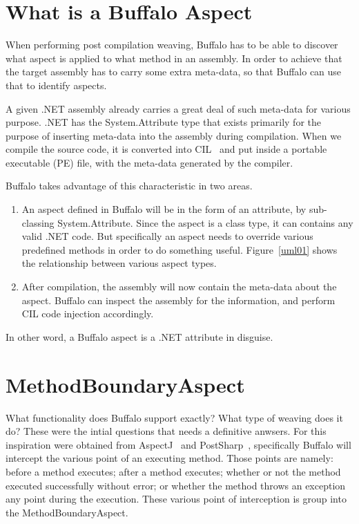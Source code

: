 \section{What is a Buffalo Aspect}

When performing post compilation weaving, Buffalo has to be able to discover what aspect is applied to what method in an assembly. In order to achieve that the target assembly has to carry some extra meta-data, so that Buffalo can use that to identify aspects.

A given .NET assembly already carries a great deal of such meta-data for various purpose. .NET has the System.Attribute type that exists primarily for the purpose of inserting meta-data into the assembly during compilation. When we compile the source code, it is converted into CIL~\cite{msil_text} and put inside a portable executable (PE) file, with the meta-data generated by the compiler. 

Buffalo takes advantage of this characteristic in two areas.
\begin{enumerate}
	\item An aspect defined in Buffalo will be in the form of an attribute, by sub-classing System.Attribute. Since the aspect is a class type, it can contains any valid .NET code. But specifically an aspect needs to override various predefined methods in order to do something useful. Figure~\ref{uml01} shows the relationship between various aspect types.
	\item After compilation, the assembly will now contain the meta-data about the aspect. Buffalo can inspect the assembly for the information, and perform CIL code injection accordingly.
\end{enumerate}

In other word, a Buffalo aspect is a .NET attribute in disguise.

\section{MethodBoundaryAspect}
What functionality does Buffalo support exactly? What type of weaving does it do? These were the intial questions that needs a definitive anwsers. For this inspiration were obtained from AspectJ~\cite{aspectj_faq} and PostSharp~\cite{postsharp}, specifically Buffalo will intercept the various point of an executing method. Those points are namely: before a method executes; after a method executes; whether or not the method executed successfully without error; or whether the method throws an exception any point during the execution. These various point of interception is group into the MethodBoundaryAspect.

